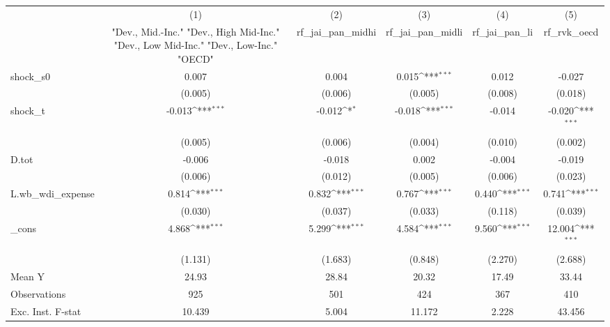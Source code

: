 {
\def\sym#1{\ifmmode^{#1}\else\(^{#1}\)\fi}
\begin{tabular}{l*{5}{c}}
\toprule
            &\multicolumn{1}{c}{(1)}&\multicolumn{1}{c}{(2)}&\multicolumn{1}{c}{(3)}&\multicolumn{1}{c}{(4)}&\multicolumn{1}{c}{(5)}\\
            &\multicolumn{1}{c}{ "Dev., Mid.-Inc." "Dev., High Mid-Inc." "Dev., Low Mid-Inc." "Dev., Low-Inc." "OECD" }&\multicolumn{1}{c}{rf\_jai\_pan\_midhi}&\multicolumn{1}{c}{rf\_jai\_pan\_midli}&\multicolumn{1}{c}{rf\_jai\_pan\_li}&\multicolumn{1}{c}{rf\_rvk\_oecd}\\
\midrule
shock\_s0    &       0.007         &       0.004         &       0.015\sym{***}&       0.012         &      -0.027         \\
            &     (0.005)         &     (0.006)         &     (0.005)         &     (0.008)         &     (0.018)         \\
\addlinespace
shock\_t     &      -0.013\sym{***}&      -0.012\sym{*}  &      -0.018\sym{***}&      -0.014         &      -0.020\sym{***}\\
            &     (0.005)         &     (0.006)         &     (0.004)         &     (0.010)         &     (0.002)         \\
\addlinespace
D.tot       &      -0.006         &      -0.018         &       0.002         &      -0.004         &      -0.019         \\
            &     (0.006)         &     (0.012)         &     (0.005)         &     (0.006)         &     (0.023)         \\
\addlinespace
L.wb\_wdi\_expense&       0.814\sym{***}&       0.832\sym{***}&       0.767\sym{***}&       0.440\sym{***}&       0.741\sym{***}\\
            &     (0.030)         &     (0.037)         &     (0.033)         &     (0.118)         &     (0.039)         \\
\addlinespace
\_cons      &       4.868\sym{***}&       5.299\sym{***}&       4.584\sym{***}&       9.560\sym{***}&      12.004\sym{***}\\
            &     (1.131)         &     (1.683)         &     (0.848)         &     (2.270)         &     (2.688)         \\
\midrule
Mean Y      &       24.93         &       28.84         &       20.32         &       17.49         &       33.44         \\
Observations&         925         &         501         &         424         &         367         &         410         \\
Exc. Inst. F-stat&      10.439         &       5.004         &      11.172         &       2.228         &      43.456         \\
\bottomrule
\end{tabular}
}
